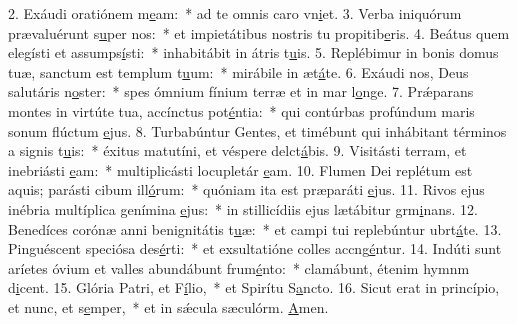 2. Exáudi oratiónem m\uline{e}am:~* ad te omnis caro vn\uline{i}et.
3. Verba iniquórum prævaluérunt s\uline{u}per nos:~* et impietátibus nostris tu propitib\uline{e}ris.
4. Beátus quem elegísti et assumps\uline{í}sti:~* inhabitábit in átris t\uline{u}is.
5. Replébimur in bonis domus tuæ, sanctum est templum t\uline{u}um:~* mirábile in æt\uline{á}te.
6. Exáudi nos, Deus salutáris n\uline{o}ster:~* spes ómnium fínium terræ et in mar l\uline{o}nge.
7. Prǽparans montes in virtúte tua, accínctus pot\uline{é}ntia:~* qui contúrbas profúndum maris sonum flúctum \uline{e}jus.
8. Turbabúntur Gentes, et timébunt qui inhábitant términos a signis t\uline{u}is:~* éxitus matutíni, et véspere delct\uline{á}bis.
9. Visitásti terram, et inebriásti \uline{e}am:~* multiplicásti locupletár \uline{e}am.
10. Flumen Dei replétum est aquis; parásti cibum ill\uline{ó}rum:~* quóniam ita est præparáti \uline{e}jus.
11. Rivos ejus inébria multíplica genímina \uline{e}jus:~* in stillicídiis ejus lætábitur grm\uline{i}nans.
12. Benedíces corónæ anni benignitátis t\uline{u}æ:~* et campi tui replebúntur ubrt\uline{á}te.
13. Pinguéscent speciósa des\uline{é}rti:~* et exsultatióne colles accng\uline{é}ntur.
14. Indúti sunt aríetes óvium et valles abundábunt frum\uline{é}nto:~* clamábunt, étenim hymnm d\uline{i}cent.
15. Glória Patri, et F\uline{í}lio,~* et Spirítu S\uline{a}ncto.
16. Sicut erat in princípio, et nunc, et s\uline{e}mper,~* et in sǽcula sæculórm. \uline{A}men.
